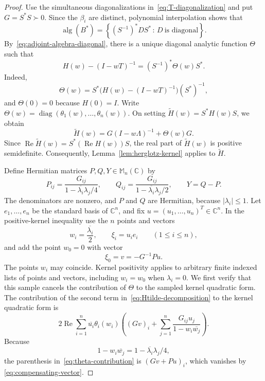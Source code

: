 \documentclass[preprints,article,submit,oneauthor]{Definitions/mdpi}
\theoremstyle{mdpi}
\theoremstyle{definition}
\newcommand{\C}{\mathbb C}
\newcommand{\Mn}{\mathbb M_n(\C)}
\newcommand{\alg}{\operatorname{alg}}
\newcommand{\RePart}{\operatorname{Re}}
\newcommand{\diag}{\operatorname{diag}}
\begin{document}
\begin{proof}
Use the simultaneous diagonalizations in~\eqref{eq:T-diagonalization}
and put $G=S^*S\succ0$.  Since the $\beta_i$ are distinct, polynomial
interpolation shows that
\begin{equation}
  \alg(B^*)
  =\left\{(S^{-1})^* D S^* \,:\,
  D\ \text{is diagonal}\right\}.
  \label{eq:adjoint-algebra-diagonal}
\end{equation}
By~\eqref{eq:adjoint-algebra-diagonal}, there is a unique diagonal
analytic function $\Theta$ such that
\[
  H(w)-(I-wT)^{-1}=(S^{-1})^*\Theta(w)S^*.
\]
Indeed,
\[
  \Theta(w)=S^*\bigl(H(w)-(I-wT)^{-1}\bigr)(S^*)^{-1},
\]
and $\Theta(0)=0$ because $H(0)=I$.
Write $\Theta(w)=\diag(\theta_1(w),\ldots,\theta_n(w))$.  On setting
$\widetilde H(w)=S^*H(w)S$, we obtain
\begin{equation}
  \widetilde H(w)=G(I-w\Lambda)^{-1}+\Theta(w)G.
  \label{eq:Htilde-decomposition}
\end{equation}
Since $\RePart\widetilde H(w)=S^*(\RePart H(w))S$, the real part of
$\widetilde H(w)$ is positive semidefinite.  Consequently,
Lemma~\ref{lem:herglotz-kernel} applies to $\widetilde H$.

Define Hermitian matrices $P,Q,Y\in\Mn$ by
\begin{equation}
  P_{ij}=\frac{G_{ij}}{1-\overline{\lambda_i}\lambda_j/4},
  \qquad
  Q_{ij}=\frac{G_{ij}}{1-\overline{\lambda_i}\lambda_j/2},
  \qquad
  Y=Q-P.
  \label{eq:PQY-definition}
\end{equation}
The denominators are nonzero, and $P$ and $Q$ are Hermitian, because
$\lvert\lambda_i\rvert\leq1$.
Let $e_1,\ldots,e_n$ be the standard basis of $\C^n$, and fix
$u=(u_1,\ldots,u_n)^T\in\C^n$.  In the positive-kernel inequality use
the $n$ points and vectors
\begin{equation}
  w_i=\frac{\overline{\lambda_i}}2,\qquad
  \xi_i=u_i e_i\qquad(1\leq i\leq n),
  \label{eq:eigenvalue-samples}
\end{equation}
and add the point $w_0=0$ with vector
\begin{equation}
  \xi_0=v=-G^{-1}Pu.
  \label{eq:compensating-vector}
\end{equation}
The points $w_i$ may coincide.  Kernel positivity applies to arbitrary
finite indexed lists of points and vectors, including $w_i=w_0$ when
$\lambda_i=0$.
We first verify that this sample cancels the contribution of $\Theta$
to the sampled kernel quadratic form.  The contribution of the second
term in~\eqref{eq:Htilde-decomposition} to the kernel quadratic form is
\begin{equation}
  2\RePart\sum_{i=1}^n
  \overline{u_i}\theta_i(w_i)
  \left(
    (Gv)_i+
    \sum_{j=1}^n
    \frac{G_{ij}u_j}{1-w_i\overline{w_j}}
  \right).
  \label{eq:theta-contribution}
\end{equation}
Because
\[
  1-w_i\overline{w_j}
  =1-\overline{\lambda_i}\lambda_j/4,
\]
the parenthesis in~\eqref{eq:theta-contribution} is
$(Gv+Pu)_i$, which vanishes by~%
\eqref{eq:compensating-vector}.


\end{proof}
\end{document}
